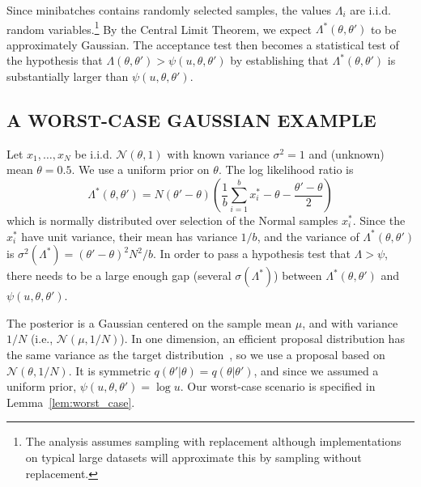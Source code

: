 \documentclass[letterpaper]{article}
\begin{document}
Since minibatches contains randomly selected samples, the values $\Lambda_i$ are
i.i.d. random variables.\footnote{The analysis assumes sampling with replacement
although implementations on typical large datasets will approximate this by
sampling without replacement.} By the Central Limit Theorem, we expect
$\Lambda^*(\theta,\theta')$ to be approximately Gaussian. The acceptance test
then becomes a statistical test of the hypothesis that
$\Lambda(\theta,\theta')>\psi(u,\theta,\theta')$ by establishing that
$\Lambda^*(\theta,\theta')$ is substantially larger than
$\psi(u,\theta,\theta')$.


\subsection{A WORST-CASE GAUSSIAN EXAMPLE}\label{ssec:gaussian_example}

Let $x_1,\ldots,x_N$ be i.i.d. $\mathcal{N}(\theta,1)$ with known variance
$\sigma^2=1$ and (unknown) mean $\theta=0.5$. We use a uniform prior on
$\theta$. The log likelihood ratio is
\begin{equation}\label{eq:lemma_ll_ratio}
    \Lambda^*(\theta,\theta') = N(\theta'-\theta)\left(\frac{1}{b}\sum_{i=1}^b
    x_i^*-\theta-\frac{\theta'-\theta}{2}\right)
\end{equation}
which is normally distributed over selection of the Normal samples $x_i^*$.
Since the $x_i^*$ have unit variance, their mean has variance $1/b$, and the
variance of $\Lambda^*(\theta,\theta')$ is $\sigma^2(\Lambda^*) =
(\theta'-\theta)^2N^2/b$.  In order to pass a hypothesis test that $\Lambda >
\psi$, there needs to be a large enough gap (several $\sigma(\Lambda^*)$)
between $\Lambda^*(\theta,\theta')$ and $\psi(u,\theta,\theta')$. 

The posterior is a Gaussian centered on the sample mean $\mu$, and with variance
$1/N$ (i.e., $\mathcal{N}(\mu, 1/N)$). In one dimension, an efficient proposal
distribution has the same variance as the target
distribution~\citep{OptimalScaling01}, so we use a proposal based on
$\mathcal{N}(\theta,1/N)$. It is symmetric
$q(\theta'|\theta)=q(\theta|\theta')$, and since we assumed a uniform prior,
$\psi(u,\theta,\theta')=\log u$. Our worst-case scenario is specified in
Lemma~\ref{lem:worst_case}.
\end{document}
